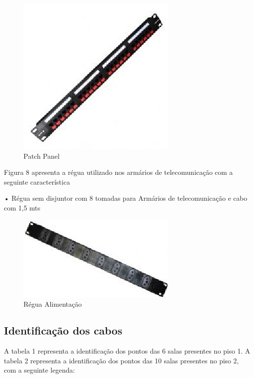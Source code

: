 \documentclass[	DIV=calc,%
							paper=a4,%
							fontsize=12pt,%
							onecolumn]{scrartcl}	 					%
\begin{document}
\begin{figure}
	\centering
	\includegraphics[width=0.7\linewidth]{pathcpanel}
	\caption{Patch Panel }
	\label{fig:pathcpanel}
\end{figure}

Figura 8 apresenta a régua utilizado nos armários de telecomunicação com a seguinte
característica 

• Régua sem disjuntor com 8 tomadas para Armários de telecomunicação e cabo com 1,5 mts


\begin{figure}
	\centering
	\includegraphics[width=0.7\linewidth]{reguaene}
	\caption{Régua Alimentação}
	\label{fig:reguaene}
\end{figure}

\subsection{Identificação dos cabos}
A tabela 1 representa a identificação dos pontos das 6 salas presentes no piso 1. A tabela
2 representa a identificação dos pontos das 10 salas presentes no piso 2, com a seguinte
legenda:
\end{document}

